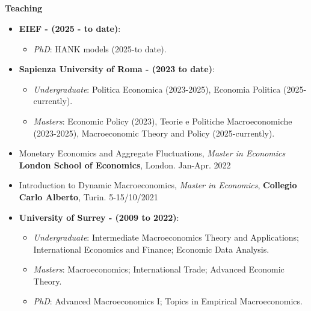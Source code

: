 \documentclass[margin, 11pt]{res} %
\begin{document}
\begin{resume}







\section{}

\textbf{Teaching}

\begin{itemize}
    \item \textbf{EIEF - (2025 - to date)}:
    \begin{itemize}
        \item \emph{PhD}: HANK models (2025-to date).
    \end{itemize}

    \item \textbf{Sapienza University of Roma - (2023 to date)}:
    \begin{itemize}
        \item \emph{Undergraduate}: Politica Economica (2023-2025), Economia Politica (2025-currently). 
        \item \emph{Masters}: Economic Policy (2023), Teorie e Politiche Macroeconomiche (2023-2025), Macroeconomic Theory and Policy (2025-currently).  
    \end{itemize}

    \item Monetary Economics and Aggregate Fluctuations, \emph{Master in Economics} \textbf{London School of Economics}, London. \hfill Jan-Apr. 2022 
    \item Introduction to Dynamic Macroeconomics, \emph{Master in Economics}, \textbf{Collegio Carlo Alberto}, Turin. \hfill 5-15/10/2021 
    \item \textbf{University of Surrey - (2009 to 2022)}:

\begin{itemize}
	\item \emph{Undergraduate}: Intermediate Macroeconomics Theory and Applications; International Economics and Finance; Economic Data Analysis. 
	\item \emph{Masters}: Macroeconomics; International Trade; Advanced Economic Theory. 
	\item \emph{PhD}: Advanced Macroeconomics I; Topics in Empirical Macroeconomics. 
\end{itemize}
\end{itemize}



\end{resume}
\end{document}
